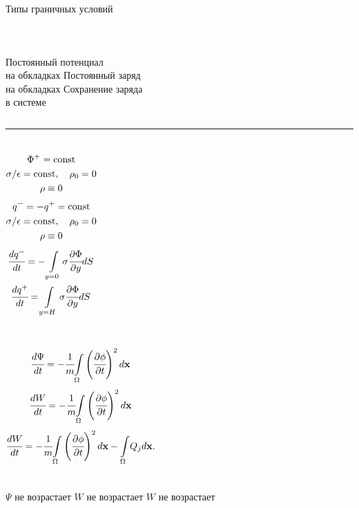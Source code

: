 {\nologo
\begin{frame}{Типы граничных условий}
\vspace{-6mm}
\begin{columns}
    \vspace{0.85\textheight}
    \rule{0.4pt}{0.85\textheight}
    \vspace{0.85\textheight}
    \rule{0.4pt}{0.85\textheight}
    \vspace{0.85\textheight}
\end{columns}
\vspace{-0.83\textheight}
\begin{columns}
    \centering
    Постоянный потенциал \\ на обкладках
    \centering
    Постоянный заряд \\ на обкладках
    \centering
    Сохранение заряда \\ в системе
\end{columns}
\vspace{2mm}
\noindent\rule[0.5ex]{\linewidth}{0.4pt}
\vspace*{-7mm}
\begin{columns}
    \begin{gather*}
        \Phi^+ = \operatorname{{const}} \\
        \sigma / \epsilon = \operatorname{{const}}, \quad \rho_0 = 0 \\
        \rho \equiv 0
    \end{gather*}
    \begin{gather*}
        q^- = -q^+ = \operatorname{{const}} \\
        \sigma / \epsilon = \operatorname{{const}}, \quad \rho_0 = 0 \\
        \rho \equiv 0
    \end{gather*}
    \begin{gather*}
        \cfrac{d q^-}{dt} = -\int\limits_{y = 0} \sigma \cfrac{\partial \Phi}{\partial y} dS \\
        \cfrac{d q^+}{dt} = \int\limits_{y = H} \sigma \cfrac{\partial \Phi}{\partial y} dS
    \end{gather*}
\end{columns}
{\small
\begin{columns}
    \[
        \cfrac{d \Psi}{dt} = -\cfrac{1}{m} {\int\limits_\Omega} \left( \cfrac{\partial \phi}{\partial t} \right)^2 d {\textbf{x}}
    \]
    \[
        \cfrac{dW}{dt} = -\cfrac{1}{m} {\int\limits_\Omega} \left( \cfrac{\partial \phi}{\partial t} \right)^2 d {\textbf{x}}
    \]
    \[
        \cfrac{dW}{dt} = -\cfrac{1}{m} {\int\limits_\Omega} \left( \cfrac{\partial \phi}{\partial t} \right)^2 d {\textbf{x}} - {\int\limits_\Omega} Q_j d {\textbf{x}}.
    \]
\end{columns}
}
\vspace{3mm}
\begin{columns}
    \centering
    $\Psi$ не возрастает
    \centering
    $W$ не возрастает
    \centering
    $W$ не возрастает
\end{columns}
\end{frame}
}